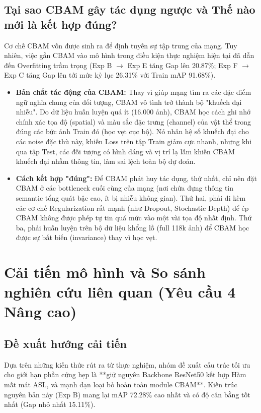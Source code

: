 \documentclass{article}
\begin{document}
\subsection{Tại sao CBAM gây tác dụng ngược và Thế nào mới là kết hợp đúng?}
Cơ chế CBAM vốn được sinh ra để định tuyến sự tập trung của mạng. Tuy nhiên, việc gắn CBAM vào mô hình trong điều kiện thực nghiệm hiện tại đã dẫn đến Overfitting trầm trọng (Exp B $\to$ Exp E tăng Gap lên 20.87\%; Exp F $\to$ Exp C tăng Gap lên tới mức kỷ lục 26.31\% với Train mAP 91.68\%).
\begin{itemize}
    \item \textbf{Bản chất tác động của CBAM:} Thay vì giúp mạng tìm ra các đặc điểm ngữ nghĩa chung của đối tượng, CBAM vô tình trở thành bộ "khuếch đại nhiễu". Do dữ liệu huấn luyện quá ít (16.000 ảnh), CBAM học cách ghi nhớ chính xác tọa độ (spatial) và màu sắc đặc trưng (channel) của vật thể trong đúng các bức ảnh Train đó (học vẹt cục bộ). Nó nhân hệ số khuếch đại cho các noise đặc thù này, khiến Loss trên tập Train giảm cực nhanh, nhưng khi qua tập Test, các đối tượng có hình dáng và vị trí lạ lẫm khiến CBAM khuếch đại nhầm thông tin, làm sai lệch toàn bộ dự đoán.
    \item \textbf{Cách kết hợp "đúng":} Để CBAM phát huy tác dụng, thứ nhất, chỉ nên đặt CBAM ở các bottleneck cuối cùng của mạng (nơi chứa đựng thông tin semantic tổng quát bậc cao, ít bị nhiễu không gian). Thứ hai, phải đi kèm các cơ chế Regularization rất mạnh (như Dropout, Stochastic Depth) để ép CBAM không được phép tự tin quá mức vào một vài tọa độ nhất định. Thứ ba, phải huấn luyện trên bộ dữ liệu khổng lồ (full 118k ảnh) để CBAM học được sự bất biến (invariance) thay vì học vẹt.
\end{itemize}

\section{Cải tiến mô hình và So sánh nghiên cứu liên quan (Yêu cầu 4 Nâng cao)}

\subsection{Đề xuất hướng cải tiến}
Dựa trên những kiến thức rút ra từ thực nghiệm, nhóm đề xuất cấu trúc tối ưu cho giới hạn phần cứng hẹp là **giữ nguyên Backbone ResNet50 kết hợp Hàm mất mát ASL, và mạnh dạn loại bỏ hoàn toàn module CBAM**. Kiến trúc nguyên bản này (Exp B) mang lại mAP 72.28\% cao nhất và có độ cân bằng tốt nhất (Gap nhỏ nhất 15.11\%).
\end{document}
